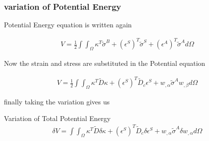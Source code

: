 \documentclass[9pt]{beamer}
\begin{document}
\begin{frame}
\frametitle{variation of Potential Energy}

Potential Energy equation is written again

\begin{equation*}
\begin{split}
V=\frac{1}{2} \int\int_\Omega \kappa^T \tilde{\sigma}^B 
+ \left({\epsilon}^S\right)^T \tilde{\sigma}^S 
+ \left({\epsilon}^A\right)^T \tilde{\sigma}^A  d \Omega
\end{split}
\end{equation*}

Now the strain and stress are substituted in the Potential equation


\begin{equation*}
\begin{split}
V=\frac{1}{2} \int\int_\Omega  \kappa^T \tilde{D}  \kappa 
+ \left({\epsilon}^S\right)^T {\tilde{D}_c}{\epsilon}^S 
+ w_{, \alpha} \tilde{\sigma}^A w_{, \beta}  d \Omega
\end{split}
\end{equation*}

finally taking the variation gives us
\begin{block}{Variation of Total Potential Energy}
\begin{equation*}
\begin{split}
\delta V=\int\int_\Omega  \kappa^T \tilde{D}  \delta \kappa 
+ \left({\epsilon}^S\right)^T {\tilde{D}_c}  \delta {\epsilon}^S 
+ w_{, \alpha} \tilde{\sigma}^A  \delta w_{, \alpha}  d \Omega
\end{split}
\end{equation*}

\end{block}

\end{frame}
\end{document}
